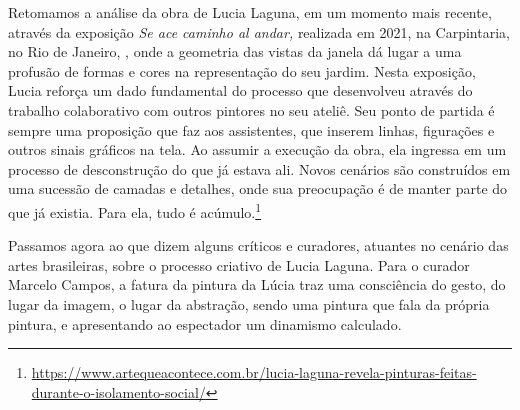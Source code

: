 Retomamos a análise da obra de Lucia Laguna, em um momento mais
recente, através da exposição \emph{Se ace caminho al andar,} realizada
em 2021, na Carpintaria, no Rio de Janeiro, \parencite{gabriel2022laguna},
onde a geometria das vistas da janela dá lugar a uma profusão de formas
e cores na representação do seu jardim. Nesta exposição, Lucia reforça
um dado fundamental do processo que desenvolveu através do trabalho
colaborativo com outros pintores no seu ateliê. Seu ponto de partida é
sempre uma proposição que faz aos assistentes, que inserem linhas,
figurações e outros sinais gráficos na tela. Ao assumir a execução da
obra, ela ingressa em um processo de desconstrução do que já estava
ali. Novos cenários são construídos em uma sucessão de camadas e
detalhes, onde sua preocupação é de manter parte do que já existia.
Para ela, tudo é
acúmulo.\footnote{\url{https://www.artequeacontece.com.br/lucia-laguna-revela-pinturas-feitas-durante-o-isolamento-social/}}

Passamos agora ao que dizem alguns críticos e curadores, atuantes no
cenário das artes brasileiras, sobre o processo criativo de Lucia
Laguna. Para o curador Marcelo Campos, \parencite{gabriel2022laguna} a fatura
da pintura da Lúcia traz uma consciência do gesto, do lugar da imagem,
o lugar da abstração, sendo uma pintura que fala da própria pintura, e
apresentando ao espectador um dinamismo calculado.


